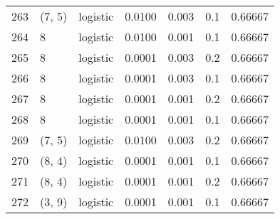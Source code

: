 \begin{tabular}{lllrrrr}
263 &      (7, 5) &  logistic &  0.0100 &  0.003 &  0.1 &   0.66667 \\
264 &           8 &  logistic &  0.0100 &  0.001 &  0.1 &   0.66667 \\
265 &           8 &  logistic &  0.0001 &  0.003 &  0.2 &   0.66667 \\
266 &           8 &  logistic &  0.0001 &  0.003 &  0.1 &   0.66667 \\
267 &           8 &  logistic &  0.0001 &  0.001 &  0.2 &   0.66667 \\
268 &           8 &  logistic &  0.0001 &  0.001 &  0.1 &   0.66667 \\
269 &      (7, 5) &  logistic &  0.0100 &  0.003 &  0.2 &   0.66667 \\
270 &      (8, 4) &  logistic &  0.0001 &  0.001 &  0.1 &   0.66667 \\
271 &      (8, 4) &  logistic &  0.0001 &  0.001 &  0.2 &   0.66667 \\
272 &      (3, 9) &  logistic &  0.0001 &  0.001 &  0.1 &   0.66667 \\
\bottomrule
\end{tabular}

